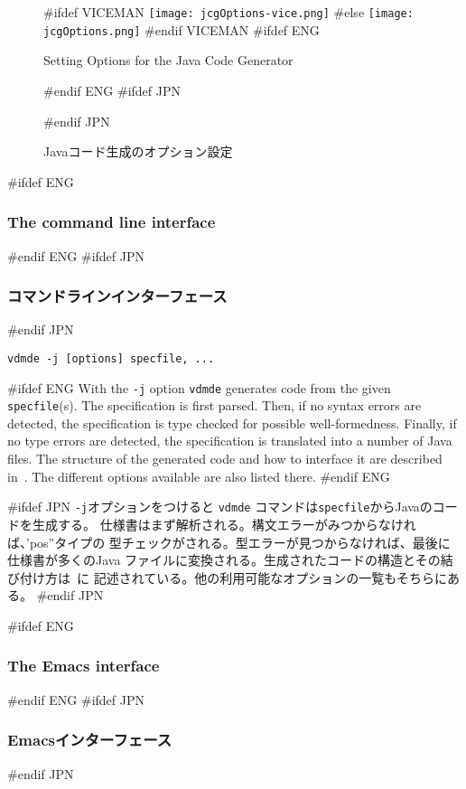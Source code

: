 \documentclass[\pformat,12pt]{article}
\newcommand{\vdmde}{vdmde}
\newcommand{\vdmde}{vppde}
\begin{document}
\begin{figure}[tbh]
\begin{center}
#ifdef VICEMAN
\texttt{[image: jcgOptions-vice.png]}
#else
\texttt{[image: jcgOptions.png]}
#endif VICEMAN
#ifdef ENG
\caption{Setting Options for the Java Code Generator}
#endif ENG
#ifdef JPN
\caption{Javaコード生成のオプション設定}
#endif JPN
\label{fig:optjcg}
\end{center}
\end{figure}

#ifdef ENG
\subsubsection{The command line interface}
#endif ENG
#ifdef JPN
\subsubsection{コマンドラインインターフェース}
#endif JPN

{\tt \vdmde\ -j [options] specfile, ...}

#ifdef ENG
With the {\tt -j} option {\tt \vdmde} generates code from the given
{\tt specfile}(s). The specification is first parsed. Then, if no
syntax errors are detected, the specification is type checked for
possible well-formedness. Finally,
if no type errors are detected, the specification is translated into a
number of Java files. The structure of the generated
code and how to interface it are described in~\cite{CGJavaManPP-CSK}. The
different options available are also listed there.
#endif ENG

#ifdef JPN
{\tt -j}オプションをつけると {\tt \vdmde} コマンドは{\tt specfile}からJavaのコードを生成する。
仕様書はまず解析される。構文エラーがみつからなければ、'pos''タイプの 
型チェックがされる。型エラーが見つからなければ、最後に仕様書が多くのJava
ファイルに変換される。生成されたコードの構造とその結び付け方は~\cite{CGJavaManPP-CSK}に
記述されている。他の利用可能なオプションの一覧もそちらにある。
#endif JPN

#ifdef ENG
\subsubsection{The Emacs interface}
#endif ENG
#ifdef JPN
\subsubsection{Emacsインターフェース}
#endif JPN
\end{document}
